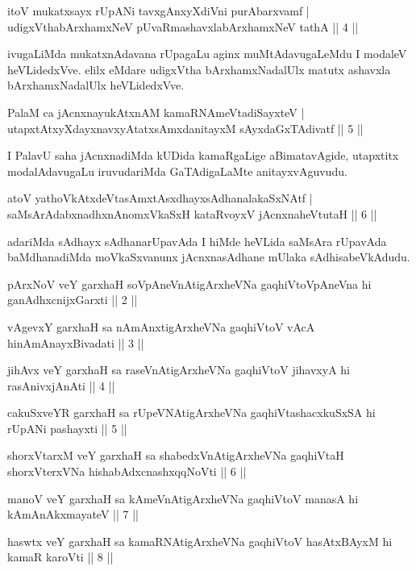 \begin{shl}
itoV mukatxsayx rUpANi tavxgAnxyXdiVni purA\s barxvamf |\\
udigxVthabArxhamxNeV pUvaRmashavxlabArxhamxNeV tathA \hfill || 4 ||
\end{shl}

\begin{artha}
ivugaLiMda mukatxnAdavana rUpagaLu aginx muMtAdavugaLeMdu I modaleV heVLidedxVve. elilx eMdare udigxVtha bArxhamxNadalUlx matutx ashavxla bArxhamxNadalUlx heVLidedxVve.
\end{artha}


\begin{shl}
PalaM ca jAcnxnayukAtxnAM kamaRNAmeVtadiSayxteV |\\
utapxtAtxyXdayxnavxyAtatxsAmxdanitayxM sAyxdaGxTAdivatf \hfill || 5 ||
\end{shl}

\begin{artha}
I PalavU saha jAcnxnadiMda kUDida kamaRgaLige aBimatavAgide, utapxtitx modalAdavugaLu iruvudariMda GaTAdigaLaMte anitayxvAguvudu.
\end{artha}

\begin{shl}
atoV yathoVkAtxdeVtasAmxtAsxdhayxsAdhanalakaSxNAtf |\\
saMsArAdabxnadhxnAnomxVkaSxH kataRvoyxV jAcnxnaheVtutaH \hfill || 6 ||
\end{shl}

\begin{artha}
adariMda sAdhayx sAdhanarUpavAda I hiMde heVLida saMsAra rUpavAda baMdhanadiMda moVkaSxvanunx jAcnxnasAdhane mUlaka sAdhisabeVkAdudu.
\end{artha}


\begin{kandikeshl}
pArxNoV veY garxhaH soV\s pAneVnAtigArxheVNa gaqhiVtoV\s pAneVna hi ganAdhxcnijxGarxti || 2 ||

vAgevxY garxhaH sa nAmAnxtigArxheVNa gaqhiVtoV vAcA hi\break nAmAnayxBivadati || 3 ||

jihAvx veY garxhaH sa raseVnAtigArxheVNa gaqhiVtoV jihavxyA hi rasAnivxjAnAti || 4 ||

cakuSxveYR garxhaH sa rUpeVNAtigArxheVNa gaqhiVtashacxkuSxSA hi rUpANi pashayxti || 5 ||

shorxVtarxM veY garxhaH sa shabedxVnAtigArxheVNa gaqhiVtaH shorxVterxVNa hi\break shabAdxcnashxqqNoVti || 6 ||

manoV veY garxhaH sa kAmeVnAtigArxheVNa gaqhiVtoV manasA hi kAmAnAkxmayateV || 7 ||

haswtx veY garxhaH sa kamaRNAtigArxheVNa gaqhiVtoV hasAtxBAyxM hi kamaR karoVti || 8 ||
\end{kandikeshl}

